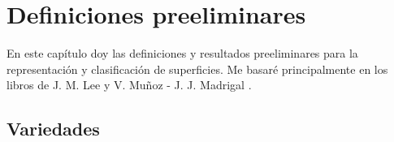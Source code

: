 \documentclass[10pt]{report}
\theoremstyle{definition}
\begin{document}

\tableofcontents
\listoffigures



\chapter{Definiciones preeliminares}
En este capítulo doy las definiciones y resultados preeliminares para la representación y clasificación de superficies. Me basaré principalmente en los libros de J. M. Lee \cite{lee1} y V. Muñoz - J. J. Madrigal \cite{juanjo}.

\section{Variedades}
\end{document}
